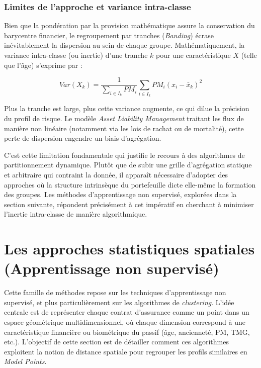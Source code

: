 \subsubsection{Limites de l'approche et variance intra-classe}

Bien que la pondération par la provision mathématique assure la conservation du barycentre financier, le regroupement par tranches (\textit{Banding}) écrase inévitablement la dispersion au sein de chaque groupe. Mathématiquement, la variance intra-classe (ou inertie) d'une tranche $k$ pour une caractéristique $X$ (telle que l'âge) s'exprime par :

\begin{equation}
    Var(X_k) = \frac{1}{\sum_{i \in I_k} \textit{PM}_i} \sum_{i \in I_k} \textit{PM}_i (x_i - \bar{x}_k)^2 
\end{equation}

Plus la tranche est large, plus cette variance augmente, ce qui dilue la précision du profil de risque. Le modèle \textit{Asset Liability Management} traitant les flux de manière non linéaire (notamment via les lois de rachat ou de mortalité), cette perte de dispersion engendre un biais d'agrégation. 

C'est cette limitation fondamentale qui justifie le recours à des algorithmes de partitionnement dynamique. Plutôt que de subir une grille d'agrégation statique et arbitraire qui contraint la donnée, il apparaît nécessaire d'adopter des approches où la structure intrinsèque du portefeuille dicte elle-même la formation des groupes. Les méthodes d'apprentissage non supervisé, explorées dans la section suivante, répondent précisément à cet impératif en cherchant à minimiser l'inertie intra-classe de manière algorithmique.

\section{Les approches statistiques spatiales (Apprentissage non supervisé)}

Cette famille de méthodes repose sur les techniques d'apprentissage non supervisé, et plus particulièrement sur les algorithmes de \textit{clustering}. L'idée centrale est de représenter chaque contrat d'assurance comme un point dans un espace géométrique multidimensionnel, où chaque dimension correspond à une caractéristique financière ou biométrique du passif (âge, ancienneté, PM, TMG, etc.). L'objectif de cette section est de détailler comment ces algorithmes exploitent la notion de distance spatiale pour regrouper les profils similaires en \textit{Model Points}. 

